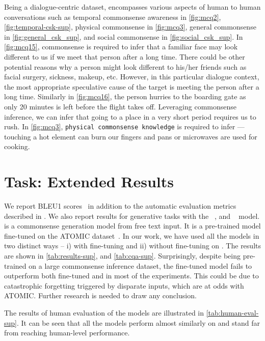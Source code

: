 Being a dialogue-centric dataset, \dataset{} encompasses various aspects of human to human conversations such as temporal commonsense awareness in \cref{fig:mcq2}, \cref{fig:temporal-csk-sup}, physical commonsense in \cref{fig:mcq3}, general commonsense in \cref{fig:general_csk_sup}, and social commonsense in \cref{fig:social_csk_sup}.  In \cref{fig:mcq15}, commonsense is required to infer that a familiar face may look different to us if we meet that person after a long time. There could be other potential reasons why a person might look different to his/her friends such as facial surgery, sickness, makeup, etc. However, in this particular dialogue context, the most appropriate speculative cause of the target is meeting the person after a long time. Similarly in \cref{fig:mcq16}, the person hurries to the boarding gate as only 20 minutes is left before the flight takes off. Leveraging commonsense inference, we can infer that going to a place in a very short period requires us to rush.  In \cref{fig:mcq3}, \texttt{physical commonsense knowledge} is required to infer --- touching a hot element can burn our fingers and pans or microwaves are used for cooking.

\section{\dataset{} Task: Extended Results}
\label{sec:appendix-ex}
We report BLEU1 scores~\cite{papineni2002bleu} in addition to the automatic evaluation metrics described in . We also report results for generative tasks with the  ~\cite{lewis2019bart}, and ~\cite{Hwang2021COMETATOMIC2O} model.  is a commonsense generation model from free text input. It is a pre-trained  model fine-tuned on the ATOMIC dataset~\cite{Hwang2021COMETATOMIC2O}. In our work, we have used all the models in two distinct ways -- i) with fine-tuning and ii) without fine-tuning on \dataset{}. The results are shown in \cref{tab:results-sup}, and \cref{tab:cqa-sup}. Surprisingly, despite being pre-trained on a large commonsense inference dataset, the fine-tuned  model fails to outperform both fine-tuned  and  in most of the experiments. This could be due to catastrophic forgetting triggered by disparate inputs, which are at odds with ATOMIC. Further research is needed to draw any conclusion.

The results of human evaluation of the models are illustrated in \cref{tab:human-eval-sup}. It can be seen that all the models perform almost similarly on \dataset{} and stand far from reaching human-level performance.

